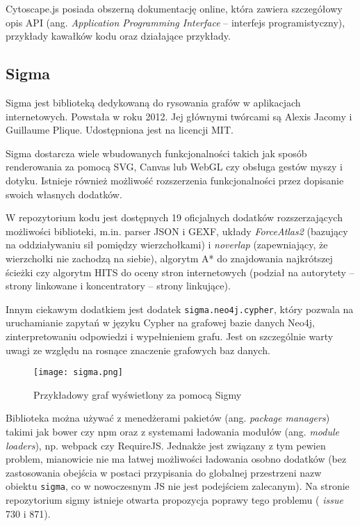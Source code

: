 Cytoscape.js posiada obszerną dokumentację online, która zawiera szczegółowy opis API (ang. \textit{Application Programming Interface} -- interfejs programistyczny), przykłady kawałków kodu oraz działające przykłady. 

\subsection{Sigma}

Sigma jest biblioteką dedykowaną do rysowania grafów w aplikacjach internetowych. Powstała w roku 2012. Jej głównymi twórcami są Alexis Jacomy i Guillaume Plique. Udostępniona jest na licencji MIT. 

Sigma dostarcza wiele wbudowanych funkcjonalności takich jak sposób renderowania za pomocą SVG, Canvas lub WebGL czy obsługa gestów myszy i dotyku. Istnieje również możliwość rozszerzenia funkcjonalności przez dopisanie swoich własnych dodatków. 

W repozytorium kodu jest dostępnych 19 oficjalnych dodatków rozszerzających możliwości biblioteki, m.in. parser JSON i GEXF, układy \textit{ForceAtlas2} (bazujący na oddziaływaniu sił pomiędzy wierzchołkami) i \textit{noverlap} (zapewniający, że wierzchołki nie zachodzą na siebie), algorytm A* do znajdowania najkrótszej ścieżki czy algorytm HITS do oceny stron internetowych (podział na autorytety -- strony linkowane i koncentratory -- strony linkujące). 

Innym ciekawym dodatkiem jest dodatek \texttt{sigma.neo4j.cypher}, który pozwala na uruchamianie zapytań w języku Cypher na grafowej bazie danych Neo4j, zinterpretowaniu odpowiedzi i wypełnieniem grafu. Jest on szczególnie warty uwagi ze względu na rosnące znaczenie grafowych baz danych. 

\bigskip

\begin{figure}[H]
\centering
\texttt{[image: sigma.png]}
\captionsetup{justification=centering}
\caption{Przykładowy graf wyświetlony za pomocą Sigmy}\label{fig:sigma}
\end{figure}

\bigskip

Biblioteka można używać z menedżerami pakietów (ang. \textit{package managers}) takimi jak bower czy npm oraz z systemami ładowania modułów (ang. \textit{module loaders}), np. webpack czy RequireJS. Jednakże jest związany z tym pewien problem, mianowicie nie ma łatwej możliwości ładowania osobno dodatków (bez zastosowania obejścia w postaci przypisania do globalnej przestrzeni nazw obiektu \texttt{sigma}, co w nowoczesnym JS nie jest podejściem zalecanym). Na stronie repozytorium sigmy istnieje otwarta propozycja poprawy tego problemu (\cite{sigma-repo} \textit{issue} 730 i 871).


